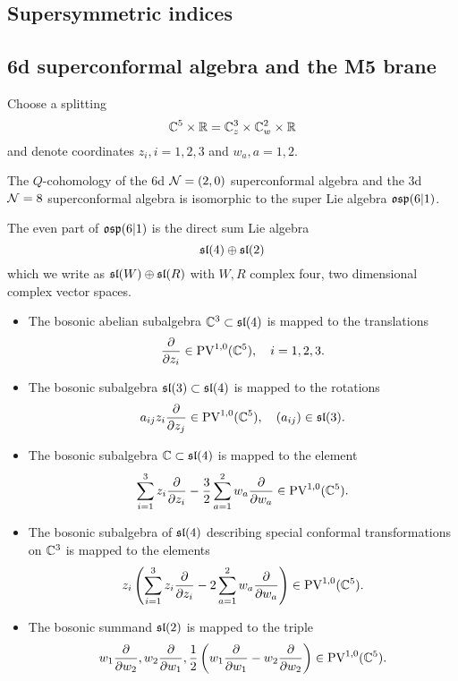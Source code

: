 \documentclass[11pt]{amsart}
\begin{document}

\subsection{Supersymmetric indices}


\subsection{6d superconformal algebra and the M5 brane}

Choose a splitting 
\[
\mathbb C^5 \times \mathbb R = \mathbb C_z^3 \times \mathbb C_w^2 \times \mathbb R
\]
and denote coordinates $z_i, i=1,2,3$ and $w_a, a=1,2$. 

\begin{prop}
The $Q$-cohomology of the 6d $\mathcal N=(2,0)$ superconformal algebra and the 3d $\mathcal N=8$ superconformal algebra is isomorphic to the super Lie algebra $\mathfrak{osp}(6|1)$. 
\end{prop}


\parsec[]

The even part of $\mathfrak{osp}(6|1)$ is the direct sum Lie algebra
\[
\mathfrak{sl}(4) \oplus \mathfrak{sl}(2)
\]
which we write as $\mathfrak{sl}(W) \oplus \mathfrak{sl}(R)$ with $W,R$ complex four, two dimensional complex vector spaces. 

\begin{itemize}

\item
The bosonic abelian subalgebra $\mathbb C^3 \subset \mathfrak{sl}(4)$ is mapped to the translations 
\[
\frac{\partial}{\partial z_i} \in {\rm PV}^{1,0}(\mathbb C^5) , \quad i=1,2,3.
\]

\item
The bosonic subalgebra $\mathfrak{sl}(3) \subset \mathfrak{sl}(4)$ is mapped to the 
rotations
\[
a_{ij} z_i \frac{\partial}{\partial z_j} \in {\rm PV}^{1,0}(\mathbb C^5) , \quad (a_{ij}) \in \mathfrak{sl}(3) .
\]

\item
The bosonic subalgebra $\mathbb C \subset \mathfrak{sl}(4)$ is mapped to the element
\[
\sum_{i=1}^3 z_i \frac{\partial}{\partial z_i} - \frac32 \sum_{a=1}^2 w_a \frac{\partial}{\partial w_a} \in {\rm PV}^{1,0}(\mathbb C^5)  .
\] 

\item 
The bosonic subalgebra of $\mathfrak{sl}(4)$ describing special conformal transformations on $\mathbb C^3$ is mapped to the elements 
\[
z_i \left(\sum_{i=1}^3 z_i \frac{\partial}{\partial z_i} - 2 \sum_{a=1}^2 w_a \frac{\partial}{\partial w_a} \right) \in {\rm PV}^{1,0}(\mathbb C^5) .
\] 

\item 
The bosonic summand $\mathfrak{sl}(2)$ is mapped to the triple
\[
w_1 \frac{\partial}{\partial w_2}, w_2 \frac{\partial}{\partial w_1}, \frac12 \left(w_1 \frac{\partial}{\partial w_1} - w_2 \frac{\partial}{\partial w_2}\right) \in {\rm PV}^{1,0}(\mathbb C^5).
\]
\end{itemize}
\end{document}
